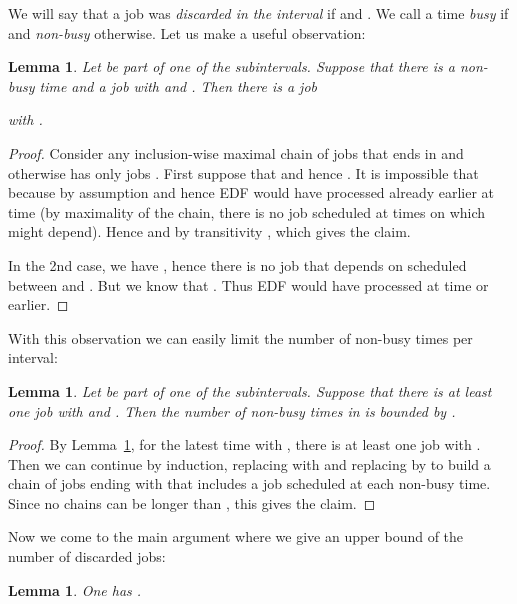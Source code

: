 \documentclass[11pt,letterpaper,oneside,english]{article}
\theoremstyle{theorem}
\newtheorem{lemma}[theorem]{Lemma}
\begin{document}
We will say that a job  was \emph{discarded in the interval }
if  and
. We call a time  \emph{busy} if
 and \emph{non-busy} otherwise.
Let us make a useful observation:
\begin{lemma} \label{lem:dep-discarded-job-to-nonbusy-time}
Let  be part of one of the subintervals. Suppose that there is a non-busy time 
and a job  with  and . Then there is a job

with .
\end{lemma}
\begin{proof}
Consider any inclusion-wise maximal chain of jobs  that
ends in  and otherwise has only jobs .
First suppose that  and hence .
It is impossible that  because by assumption  and hence
EDF would have processed  already earlier at time  (by
maximality of the chain, there is
no job scheduled at times  on which 
might depend).
Hence   and by transitivity , which
gives the claim.

In the 2nd case, we have , hence there is no job that 
depends on scheduled between  and .
But we know that . Thus EDF would have processed  at time  or earlier.
\end{proof}



With this observation we can easily limit the number of non-busy times
per interval:

\begin{lemma} \label{lem:Bound-on-num-nonbusy-times}
Let  be part of one of the subintervals. Suppose that there is at least one job  with  and .
Then the number of non-busy times in  is bounded by .
\end{lemma}
\begin{proof}
By Lemma~\ref{lem:dep-discarded-job-to-nonbusy-time}, for the latest time 
with , there is at least one job  with . 
Then we can continue by induction, replacing  with  and replacing  by 
to build a chain of jobs ending with  that includes a job scheduled at each non-busy time.
Since no chains can be longer than , this gives the claim.
\end{proof}


Now we come to the main argument where we give an upper bound of the
number of discarded jobs:
\begin{lemma} 
One has .
\end{lemma}
\end{document}
